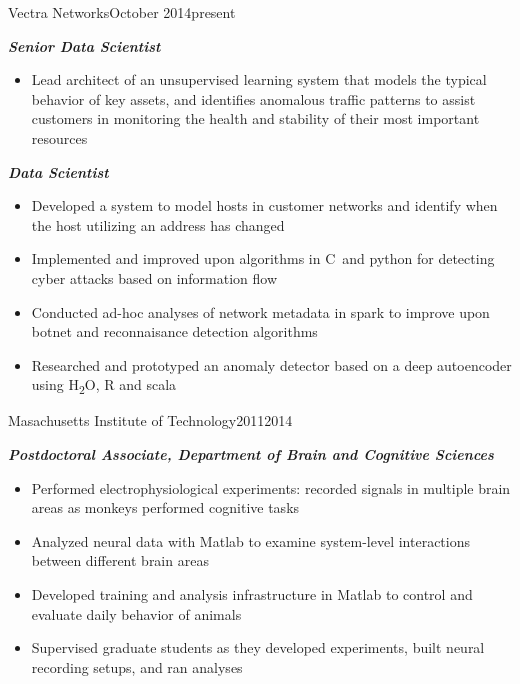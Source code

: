 \documentclass{report}
\newcommand{\CC}{C\nolinebreak\hspace{-.05em}\raisebox{.4ex}{\tiny\bf +}\nolinebreak\hspace{-.10em}\raisebox{.4ex}{\tiny\bf +}}
\newenvironment{experience_detail}[3]
{

  \noindent
  \normalsize
  \textbf{#1} \hfill \small #2 \normalsize \textendash\small~#3 \newline
  \vskip -3 mm

}
{\vspace{3mm}}
\newenvironment{position}[1]
{

  \noindent
  \textbf{\textit{#1}} \small
  \vspace{-1mm}
  \begin{itemize}[leftmargin=4mm] \setlength{\itemsep}{0cm} \setlength{\parskip}{0cm}

}
{\end{itemize}}
\begin{document}
  \begin{experience_detail}{Vectra Networks}{October 2014}{present}

    \begin{position}{Senior Data Scientist}
      \item Lead architect of an unsupervised learning system that models the typical behavior of key assets, and identifies anomalous traffic patterns to assist customers in monitoring the health and stability of their most important resources
    \end{position}

    \vspace{.5mm}

    \begin{position}{Data Scientist}
      \item Developed a system to model hosts in customer networks and identify when the host utilizing an address has changed
      \item Implemented and improved upon algorithms in \CC~and python for detecting cyber attacks based on information flow
      \item Conducted ad-hoc analyses of network metadata in spark to improve upon botnet and reconnaisance detection algorithms
      \item Researched and prototyped an anomaly detector based on a deep autoencoder using H\textsubscript{2}O, R and scala
    \end{position}

  \end{experience_detail}



  \begin{experience_detail}{Masachusetts Institute of Technology}{2011}{2014}

    \begin{position}{Postdoctoral Associate, Department of Brain and Cognitive Sciences}
      \item {} Performed electrophysiological experiments: recorded signals in multiple brain areas as monkeys performed cognitive tasks
      \item Analyzed neural data with Matlab to examine system-level interactions between different brain areas
      \item Developed training and analysis infrastructure in Matlab to control and evaluate daily behavior of animals
      \item Supervised graduate students as they developed experiments, built neural recording setups, and ran analyses
    \end{position}

  \end{experience_detail}
\end{document}

